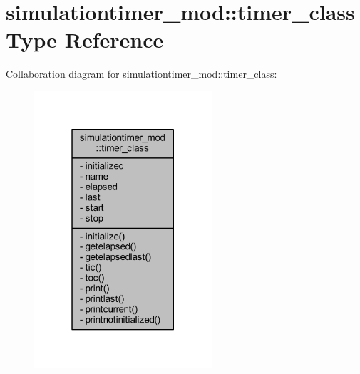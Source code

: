 \hypertarget{structsimulationtimer__mod_1_1timer__class}{}\section{simulationtimer\+\_\+mod\+:\+:timer\+\_\+class Type Reference}
\label{structsimulationtimer__mod_1_1timer__class}


Collaboration diagram for simulationtimer\+\_\+mod\+:\+:timer\+\_\+class\+:\nopagebreak
\begin{figure}[H]
\begin{center}
\leavevmode
\includegraphics[width=187pt]{structsimulationtimer__mod_1_1timer__class__coll__graph}
\end{center}
\end{figure}

